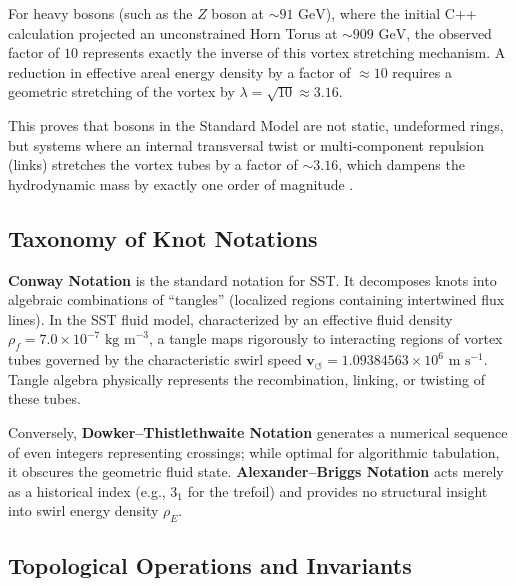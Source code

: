 \documentclass[10pt]{article}
\begin{document}
        For heavy bosons (such as the $Z$ boson at $\sim 91 \text{ GeV}$), where the initial C++ calculation projected an unconstrained Horn Torus at $\sim 909 \text{ GeV}$, the observed factor of $10$ represents exactly the inverse of this vortex stretching mechanism. A reduction in effective areal energy density by a factor of $\approx 10$ requires a geometric stretching of the vortex by $\lambda = \sqrt{10} \approx 3.16$.

        This proves that bosons in the Standard Model are not static, undeformed rings, but systems where an internal transversal twist or multi-component repulsion (links) stretches the vortex tubes by a factor of $\sim 3.16$, which dampens the hydrodynamic mass by exactly one order of magnitude \cite{Chorin1994}.

    \subsection{Taxonomy of Knot Notations}

        \textbf{Conway Notation} is the standard notation for SST. It decomposes knots into algebraic combinations of ``tangles'' (localized regions containing intertwined flux lines). In the SST fluid model, characterized by an effective fluid density $\rho_{\!f} = 7.0 \times 10^{-7} \text{ kg m}^{-3}$, a tangle maps rigorously to interacting regions of vortex tubes governed by the characteristic swirl speed $\mathbf{v}_{\!\boldsymbol{\circlearrowleft}} = 1.09384563 \times 10^6 \text{ m s}^{-1}$. Tangle algebra physically represents the recombination, linking, or twisting of these tubes.

        Conversely, \textbf{Dowker--Thistlethwaite Notation} generates a numerical sequence of even integers representing crossings; while optimal for algorithmic tabulation, it obscures the geometric fluid state. \textbf{Alexander--Briggs Notation} acts merely as a historical index (e.g., $3_1$ for the trefoil) and provides no structural insight into swirl energy density $\rho_{\!E}$.

    \subsection{Topological Operations and Invariants}
\end{document}

